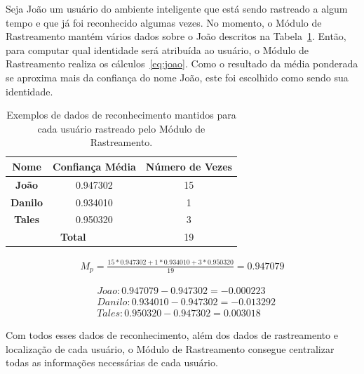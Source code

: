 	\begin{description}
		Seja João um usuário do ambiente inteligente que está sendo rastreado a algum tempo e que já foi reconhecido algumas vezes. No momento, o Módulo de Rastreamento mantém vários dados sobre o João descritos na Tabela~\ref{tab:joao}. Então, para computar qual identidade será atribuída ao usuário, o Módulo de Rastreamento realiza os cálculos~\ref{eq:joao}. Como o resultado da média ponderada se aproxima mais da confiança do nome João, este foi escolhido como sendo sua identidade.
	\end{description}

	\begin{table}[H]
		\begin{center}
			\caption{Exemplos de dados de reconhecimento mantidos para cada usuário rastreado pelo Módulo de Rastreamento.}
			\begin{tabular}{|c|c|c|}
				\hline \bf Nome & Confiança Média & Número de Vezes \\
				\hline \hline \bf João & 0.947302 & 15 \\
				\hline \bf  Danilo & 0.934010 & 1 \\
				\hline \bf Tales & 0.950320 & 3 \\
				\hline
				\hline \multicolumn{2}{|c|}{\bf Total}  & 19 \\
				\hline
			\end{tabular}
		\end{center}
		\label{tab:joao}
	\end{table}

	\begin{align}
		\label{eq:joao}
		M_p = \frac{15 * 0.947302 + 1 * 0.934010 + 3 * 0.950320}{19} = 0.947079
	\end{align}

	\begin{align}
	\nonumber & Joao: 0.947079 - 0.947302 = -0.000223\\
		\nonumber & Danilo: 0.934010 - 0.947302 = -0.013292\\
		\nonumber & Tales: 0.950320 - 0.947302 = 0.003018
	\end{align}

	Com todos esses dados de reconhecimento, além dos dados de rastreamento e localização de cada usuário, o Módulo de Rastreamento consegue centralizar todas as informações necessárias de cada usuário.

